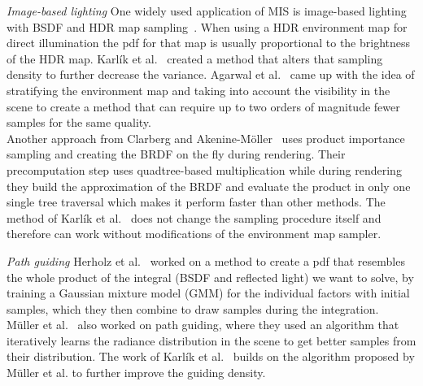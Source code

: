 \textit{Image-based lighting} One widely used application of MIS is image-based lighting with BSDF and HDR map sampling~\cite{pbr-book}.
When using a HDR environment map for direct illumination the pdf for that map is usually proportional to the brightness of the HDR map.
Karl\'ik et al.~\cite{Karlik2019} created a method that alters that sampling density to further decrease the variance.
Agarwal et al.~\cite{agarwal} came up with the idea of stratifying the environment map
and taking into account the visibility in the scene
to create a method that can require up to two orders of magnitude fewer samples for the same quality.\\
Another approach from Clarberg and Akenine-Möller~\cite{clarberg} uses product importance sampling
and creating the BRDF on the fly during rendering.
Their precomputation step uses quadtree-based multiplication while during rendering they build the approximation of the BRDF
and evaluate the product in only one single tree traversal which makes it perform faster than other methods.
The method of Karl\'ik et al.~\cite{Karlik2019} does not change the sampling procedure itself and therefore can work without modifications of the environment map sampler.

\textit{Path guiding} Herholz et al.~\cite{Herholz} worked on a method to create a pdf that resembles the whole product of the integral (BSDF and reflected light) we want to solve,
by training a Gaussian mixture model (GMM) for the individual factors with initial samples,
which they then combine to draw samples during the integration.\\
M\"uller et al.~\cite{mueller2017} also worked on path guiding,
where they used an algorithm that iteratively learns the radiance distribution in the scene to get better samples from their distribution.
The work of Karl\'ik et al.~\cite{Karlik2019} builds on the algorithm proposed by M\"uller et al. to further improve the guiding density.